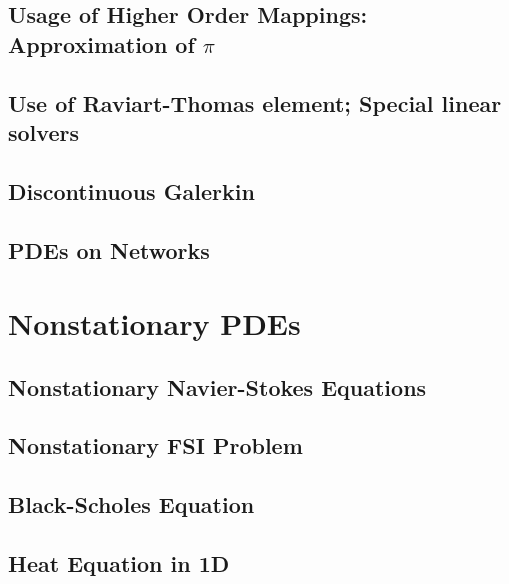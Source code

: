 \documentclass[a4paper,cleardoubleempty]{scrreprt}
\theoremstyle{plain}
\theoremstyle{remark}
\begin{document}
\subsection{Usage of Higher Order Mappings: Approximation of $\pi$}
\label{PDE_higher_order_mapping}

\clearpage
\subsection{Use of Raviart-Thomas element; Special linear solvers}
\label{PDE_RT}

\clearpage
\subsection{Discontinuous Galerkin}
\label{PDE_dG}

\clearpage
\subsection{PDEs on Networks}
\label{PDE_network}

\clearpage
\section{Nonstationary PDEs}
\label{PDE_Instat}

\subsection{Nonstationary Navier-Stokes Equations}
\label{PDE_Instat_Stokes}

\clearpage
\subsection{Nonstationary FSI Problem}
\label{PDE_Instat_FSI}

\clearpage
\subsection{Black-Scholes Equation}
\label{PDE_Instat_Black_Scholes}

\clearpage
\subsection{Heat Equation in 1D}
\label{PDE_Instat_Heat_1D}

\clearpage
\end{document}
